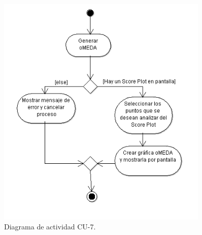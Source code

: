 \begin{figure}[H]
\centering
\includegraphics[width=0.9\textwidth]{imagenes/diagramas/DA5.png}
\caption{Diagrama de actividad CU-7.}
\end{figure}
